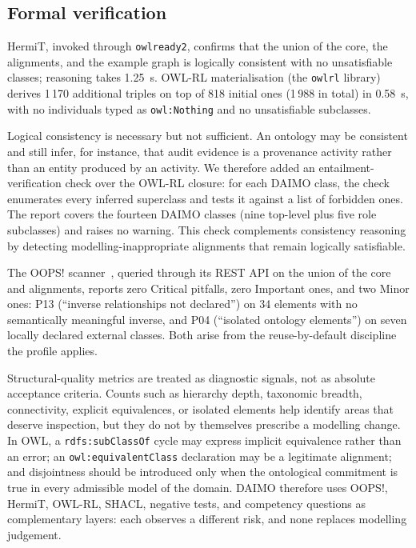\documentclass[Afour,sagev,times]{sagej}
\newcommand{\code}[1]{\texttt{#1}}
\begin{document}
\subsection{Formal verification}\label{sec:eval-engineering}

HermiT, invoked through \code{owlready2}, confirms that the union of the core, the alignments, and the example graph is logically consistent with no unsatisfiable classes; reasoning takes 1.25~s. OWL-RL materialisation (the \code{owlrl} library) derives 1\,170 additional triples on top of 818 initial ones (1\,988 in total) in 0.58~s, with no individuals typed as \code{owl:Nothing} and no unsatisfiable subclasses.

Logical consistency is necessary but not sufficient. An ontology may be consistent and still infer, for instance, that audit evidence is a provenance activity rather than an entity produced by an activity. We therefore added an entailment-verification check over the OWL-RL closure: for each DAIMO class, the check enumerates every inferred superclass and tests it against a list of forbidden ones. The report covers the fourteen DAIMO classes (nine top-level plus five role subclasses) and raises no warning. This check complements consistency reasoning by detecting modelling-inappropriate alignments that remain logically satisfiable.

The OOPS! scanner~\cite{oops14}, queried through its REST API on the union of the core and alignments, reports zero Critical pitfalls, zero Important ones, and two Minor ones: P13 (``inverse relationships not declared'') on 34 elements with no semantically meaningful inverse, and P04 (``isolated ontology elements'') on seven locally declared external classes. Both arise from the reuse-by-default discipline the profile applies.

Structural-quality metrics are treated as diagnostic signals, not as absolute acceptance criteria. Counts such as hierarchy depth, taxonomic breadth, connectivity, explicit equivalences, or isolated elements help identify areas that deserve inspection, but they do not by themselves prescribe a modelling change. In OWL, a \code{rdfs:subClassOf} cycle may express implicit equivalence rather than an error; an \code{owl:equivalentClass} declaration may be a legitimate alignment; and disjointness should be introduced only when the ontological commitment is true in every admissible model of the domain. DAIMO therefore uses OOPS!, HermiT, OWL-RL, SHACL, negative tests, and competency questions as complementary layers: each observes a different risk, and none replaces modelling judgement.
\end{document}
